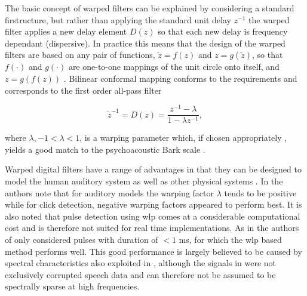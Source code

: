 The basic concept of warped filters can be explained by considering a standard \DIFdelbegin {}\DIFdelend \DIFaddbegin \gls{fir}\DIFaddend structure, but rather than applying the standard unit delay $z^{-1}$ the warped filter applies a new delay element $D(z)$ so that each new delay is frequency dependant (dispersive). In practice this means that the design of the warped filters are based on any pair of functions, $\tilde{z} = f(z)$ and $z = g(\tilde{z})$, so that $f(\cdot)$ and $g(\cdot)$ are one-to-one mappings of the unit circle onto itself, and $z = g\left( f(z) \right)$ \cite{Karjalainen1997}. Bilinear conformal mapping \cite{Brown1996} conforms to the requirements and corresponds to the first order all-pass filter

\begin{equation}\label{eq:Karjalainen1997}
\tilde{z}^{-1} = D(z) = \frac{z^{-1} - \lambda}{1 - \lambda z^{-1}},
\end{equation}

where $\lambda, -1 < \lambda < 1$, is a warping parameter which, if chosen appropriately \cite{Karjalainen1997}, yields a good match to the psychoacoustic Bark scale \cite{Smith1995}.

Warped digital filters have a range of advantages in that they can be designed to model the human auditory system as well as other physical systems \cite{Karjalainen1997}. In \cite{Esquef2002} the authors note that for auditory models the warping factor $\lambda$ tends to be positive while for click detection, negative warping factors appeared to perform best. It is also noted that pulse detection using \DIFdelbegin {}\DIFdelend \DIFaddbegin \gls{wlp} \DIFaddend comes at a considerable computational cost and is therefore not suited for real time implementations. As in \cite{Godsill1998book} the authors of \cite{Esquef2002} only considered pulses with duration of $<1$ ms, for which the \DIFdelbegin {}\DIFdelend \DIFaddbegin \gls{wlp} \DIFaddend based method performs well. This good performance is largely believed to be caused by spectral characteristics also exploited in \cite{Kasparis1993}\cite{US6795559}, although the signals in \cite{Esquef2002} were not exclusively corrupted speech data and can therefore not be assumed to be spectrally sparse at high frequencies.



